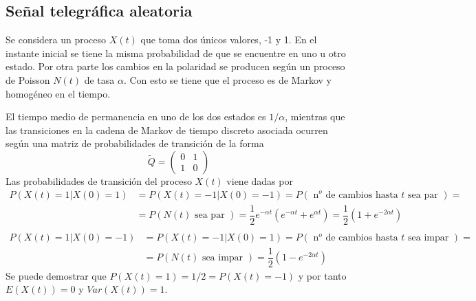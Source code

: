\subsection{Se\~{n}al telegr\'{a}fica aleatoria}
Se considera un proceso $X(t)$ que toma dos \'{u}nicos valores, -1 y
1. En el instante inicial se tiene la misma probabilidad de que se
encuentre en uno u otro estado. Por otra parte los cambios en la
polaridad se producen seg\'{u}n un proceso de Poisson $N(t)$ de tasa
$\alpha$. Con esto se tiene que el proceso es de Markov y
homog\'{e}neo en el tiempo.
\par
El tiempo medio de permanencia en uno de los dos estados es
$1/\alpha$, mientras que las transiciones en la cadena de Markov
de tiempo discreto asociada ocurren seg\'{u}n una matriz de
probabilidades de transici\'{o}n de la forma
\[
\tilde Q=\begin{pmatrix}
  0 &1 \\
  1 & 0
\end{pmatrix}
\]
Las probabilidades de transici\'{o}n del proceso $X(t)$ viene dadas
por
\[
\begin{array}{ll}
P(X(t)=1|X(0)=1)&=P(X(t)=-1|X(0)=-1)=
P(\text{ n$^o$ de cambios hasta $t$ sea par })=\\
&=P(N(t) \text{ sea par })=\dfrac{1}{2}e^{-\alpha t}(e^{-\alpha
t}+ e^{\alpha t})=
\dfrac{1}{2}(1+e^{-2\alpha t})\\
\end{array}
\]
\[
\begin{array}{ll}
P(X(t)=1|X(0)=-1)&=P(X(t)=-1|X(0)=1)=
P(\text{ n$^o$ de cambios
hasta $t$ sea impar })=
\\&=
P(N(t) \text{ sea impar })=\dfrac{1}{2}(1-e^{-2\alpha t})
\end{array}
\]
Se puede demostrar que $P(X(t)=1)=1/2=P(X(t)=-1 )$ y por tanto
$E(X(t))=0$ y $Var(X(t))=1$.
